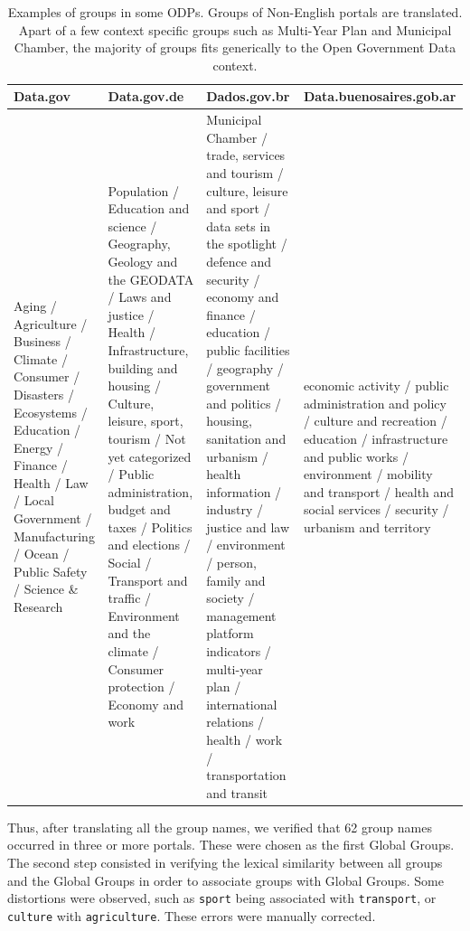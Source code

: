 \begin{table}[hb]
\centering
\ABNTEXfontereduzida
\caption[Examples of groups in some ODPs.]{Examples of groups in some ODPs. Groups of Non-English portals are translated. Apart of a few context specific groups such as Multi-Year Plan and Municipal Chamber, the majority of groups fits generically to the Open Government Data context.}
\label{tab:groups}
\begin{tabular}{|p{3.2cm}|p{3.2cm}|p{3.2cm}|p{3.6cm}|}
\hline
Data.gov & Data.gov.de & Dados.gov.br & Data.buenosaires.gob.ar \\ \hline
Aging / Agriculture / Business / Climate / Consumer / Disasters / Ecosystems / Education / Energy / Finance / Health / Law / Local Government / Manufacturing / Ocean / Public Safety / Science \& Research &
Population / Education and science / Geography, Geology and the GEODATA / Laws and justice / Health / Infrastructure, building and housing / Culture, leisure, sport, tourism / Not yet categorized / Public administration, budget and taxes / Politics and elections / Social / Transport and traffic / Environment and the climate / Consumer protection / Economy and work &
Municipal Chamber
/ trade, services and tourism
/ culture, leisure and sport
/ data sets in the spotlight
/ defence and security
/ economy and finance
/ education
/ public facilities
/ geography
/ government and politics
/ housing, sanitation and urbanism
/ health information
/ industry
/ justice and law
/ environment
/ person, family and society
/ management platform indicators
/ multi-year plan
/ international relations
/ health
/ work
/ transportation and transit &
economic activity /
public administration and policy /
culture and recreation /
education /
infrastructure and public works /
environment /
mobility and transport /
health and social services /
security /
urbanism and territory \\\hline
\end{tabular}
\end{table}

Thus, after translating all the group names, we verified that 62 group names occurred in three or more portals.
These were chosen as the first Global Groups.
The second step consisted in verifying the lexical similarity between all groups and the Global Groups in order to associate groups with Global Groups.
Some distortions were observed, such as \texttt{sport} being associated with \texttt{transport}, or \texttt{culture} with \texttt{agriculture}.
These errors were manually corrected.

